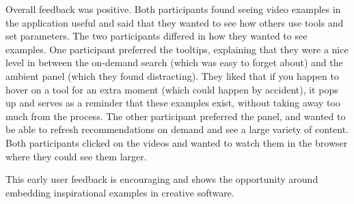 Overall feedback was positive. Both participants found seeing video examples in the application useful and said that they wanted to see how others use tools and set parameters. The two participants differed in how they wanted to see examples. One participant preferred the tooltips, explaining that they were a nice level in between the on-demand search (which was easy to forget about) and the ambient panel (which they found distracting). They liked that if you happen to hover on a tool for an extra moment (which could happen by accident), it pops up and serves as a reminder that these examples exist, without taking away too much from the process. The other participant preferred the panel, and wanted to be able to refresh recommendations on demand and see a large variety of content. Both participants clicked on the videos and wanted to watch them in the browser where they could see them larger. 

This early user feedback is encouraging and shows the opportunity around embedding inspirational examples in creative software.

